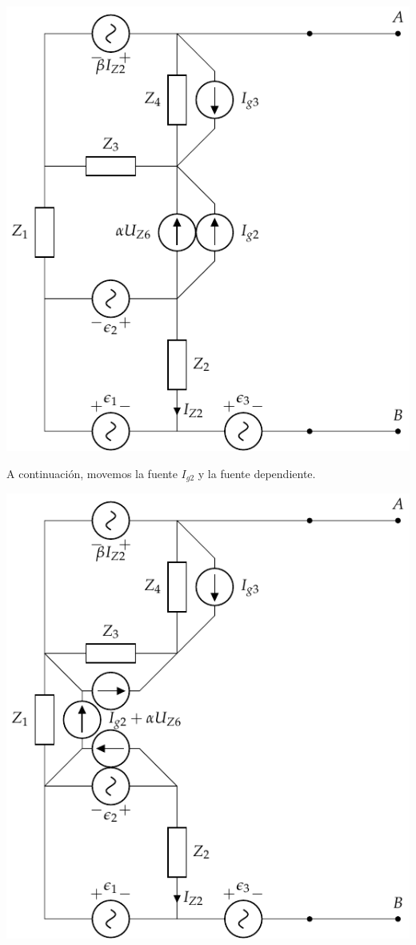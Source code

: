 \documentclass[12pt]{article}
\begin{document}
\begin{enumerate}
  \includegraphics[scale=0.8]{figs/thevenin_movilidad2.pdf}

  A continuación, movemos la fuente $I_{g2}$ y la fuente dependiente.

  \includegraphics[scale=0.7]{figs/thevenin_movilidad3.pdf}


\end{enumerate}
\end{document}
